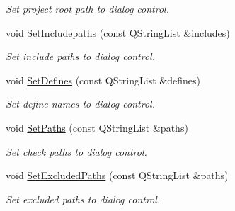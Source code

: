 \begin{DoxyCompactItemize}
\begin{DoxyCompactList}\small\item\em Set project root path to dialog control. \end{DoxyCompactList}\item 
void \hyperlink{class_project_file_dialog_a3b1c183cc53421071005958e52f9ddca}{Set\-Includepaths} (const Q\-String\-List \&includes)
\begin{DoxyCompactList}\small\item\em Set include paths to dialog control. \end{DoxyCompactList}\item 
void \hyperlink{class_project_file_dialog_ab0c66dff95a0bff37b7b52103c38537c}{Set\-Defines} (const Q\-String\-List \&defines)
\begin{DoxyCompactList}\small\item\em Set define names to dialog control. \end{DoxyCompactList}\item 
void \hyperlink{class_project_file_dialog_a73f3280302e3546deff07297a2e6d76a}{Set\-Paths} (const Q\-String\-List \&paths)
\begin{DoxyCompactList}\small\item\em Set check paths to dialog control. \end{DoxyCompactList}\item 
void \hyperlink{class_project_file_dialog_a2d426f92304118f4b4d16f8dce6b49e8}{Set\-Excluded\-Paths} (const Q\-String\-List \&paths)
\begin{DoxyCompactList}\small\item\em Set excluded paths to dialog control. \end{DoxyCompactList}\end{DoxyCompactItemize}
